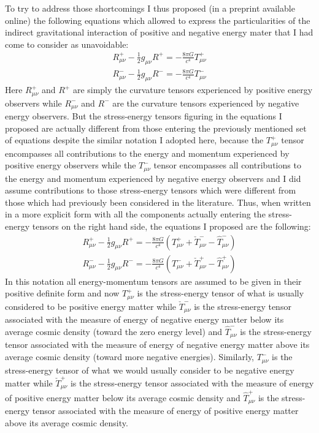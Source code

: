 \documentclass[notitlepage,12pt]{report}
\begin{document}
To try to address those shortcomings I thus proposed (in a preprint available online) the following equations which allowed to express the particularities of the indirect gravitational interaction of positive and negative energy mater that I had come to consider as unavoidable:
\begin{eqnarray}\label{eq:2.2}
R^+_{\mu\nu}-\frac{1}{2}g_{\mu\nu}R^+=-\frac{8\pi G}{c^4} T^+_{\mu\nu}\\
R^-_{\mu\nu}-\frac{1}{2}g_{\mu\nu}R^-=-\frac{8\pi G}{c^4} T^-_{\mu\nu} \nonumber
\end{eqnarray}
Here $R^+_{\mu\nu}$ and $R^+$ are simply the curvature tensors experienced by positive energy observers while $R^-_{\mu\nu}$ and $R^-$ are the curvature tensors experienced by negative energy observers. But the stress-energy tensors figuring in the equations I proposed are actually different from those entering the previously mentioned set of equations despite the similar notation I adopted here, because the $T^+_{\mu\nu}$ tensor encompasses all contributions to the energy and momentum experienced by positive energy observers while the $T^-_{\mu\nu}$ tensor encompasses all contributions to the energy and momentum experienced by negative energy observers and I did assume contributions to those stress-energy tensors which were different from those which had previously been considered in the literature. Thus, when written in a more explicit form with all the components actually entering the stress-energy tensors on the right hand side, the equations I proposed are the following:
\begin{eqnarray}\label{eq:2.3}
R^+_{\mu\nu}-\frac{1}{2}g_{\mu\nu}R^+=-\frac{8\pi G}{c^4} (T^+_{\mu\nu}+\check{T}^-_{\mu\nu}-\hat{T}^-_{\mu\nu})\\
R^-_{\mu\nu}-\frac{1}{2}g_{\mu\nu}R^-=-\frac{8\pi G}{c^4} (T^-_{\mu\nu}+\check{T}^+_{\mu\nu}-\hat{T}^+_{\mu\nu}) \nonumber
\end{eqnarray}
In this notation all energy-momentum tensors are assumed to be given in their positive definite form and now $T^+_{\mu\nu}$ is the stress-energy tensor of what is usually considered to be positive energy matter while $\check{T}^-_{\mu\nu}$ is the stress-energy tensor associated with the measure of energy of negative energy matter below its average cosmic density (toward the zero energy level) and $\hat{T}^-_{\mu\nu}$ is the stress-energy tensor associated with the measure of energy of negative energy matter above its average cosmic density (toward more negative energies). Similarly, $T^-_{\mu\nu}$ is the stress-energy tensor of what we would usually consider to be negative energy matter while $\check{T}^+_{\mu\nu}$ is the stress-energy tensor associated with the measure of energy of positive energy matter below its average cosmic density and $\hat{T}^+_{\mu\nu}$ is the stress-energy tensor associated with the measure of energy of positive energy matter above its average cosmic density.
\end{document}
